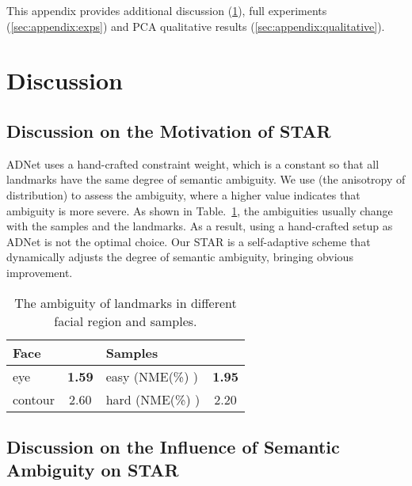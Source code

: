 \documentclass[10pt,twocolumn,letterpaper]{article}
\begin{document}
\renewcommand\thesection{\Alph{section}}
\setcounter{section}{0}
\setcounter{figure}{6}
\setcounter{table}{6}
\setcounter{equation}{8}

This appendix provides additional discussion (\cref{sec:appendix:ablation}), full experiments (\cref{sec:appendix:exps}) and PCA qualitative results (\cref{sec:appendix:qualitative}).

\section{Discussion}
\label{sec:appendix:ablation}
\subsection{Discussion on the Motivation of STAR}

ADNet\cite{huang2021adnet} uses a hand-crafted constraint weight, which is a constant so that all landmarks have the same degree of semantic ambiguity.
We use  (the anisotropy of distribution) to assess the ambiguity, where a higher value indicates that ambiguity is more severe.
As shown in Table.~\ref{tab:appendix:motivation}, the ambiguities usually change with the samples and the landmarks.
As a result, using a hand-crafted setup as ADNet is not the optimal choice.
Our STAR is a self-adaptive scheme that dynamically adjusts the degree of semantic ambiguity, bringing obvious improvement.

\begin{table}[h]
    \centering
    \begin{tabular}{lc|lc}
Face &  & Samples &  \\
    \hline
    eye     & \textbf{1.59}        & easy (NME(\%)  ) & \textbf{1.95} \\
    contour & 2.60 & hard (NME(\%)  ) & 2.20 \\
\end{tabular}
    \caption{The ambiguity of landmarks in different facial region and samples. 
}
    \label{tab:appendix:motivation}
\end{table}

\subsection{Discussion on the Influence of Semantic Ambiguity on STAR}
\end{document}
